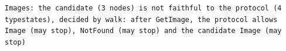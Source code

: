 \begin{lstlisting}[language={},basicstyle=\ttfamily\footnotesize,breaklines=true]
Images: the candidate (3 nodes) is not faithful to the protocol (4 typestates), decided by walk: after GetImage, the protocol allows Image (may stop), NotFound (may stop) and the candidate Image (may stop)
\end{lstlisting}
